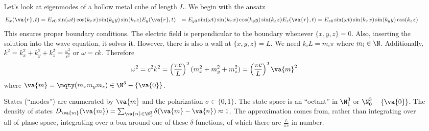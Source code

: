 \documentclass[a4paper,twoside,master.tex]{subfiles}
\begin{document}
\begin{ex}
Let's look at eigenmodes of a hollow metal cube of length $ L $. We begin with the ansatz
\begin{align}
    E_x(\va{r}, t) &= E_{x0} \sin(\omega t) \cos(k_x x) \sin(k_y y) \sin(k_z z)
    E_y(\va{r}, t) &= E_{y0} \sin(\omega t) \sin(k_x x) \cos(k_y y) \sin(k_z z)
    E_z(\va{r}, t) &= E_{z0} \sin(\omega t) \sin(k_x x) \sin(k_y y) \cos(k_z z)
\end{align}
This ensures proper boundary conditions. The electric field is perpendicular to the boundary whenever $ \{x,y,z\} = 0 $. Also, inserting the solution into the wave equation, it solves it. However, there is also a wall at $ \{x,y,z\} = L $. We need $ k_i L = m_i \pi $ where $ m_i \in \N $. Additionally, $ k^2 = k_x^2 + k_y^2 + k_z^2 = \frac{\omega^2}{c^2} $ or $ \omega = ck $. Therefore
\begin{equation}
    \omega^2 = c^2 k^2 = \left( \frac{\pi c}{L} \right)^2 (m_x^2 + m_y^2 + m_z^2) = \left( \frac{\pi c}{L} \right)^2 \va{m}^2
\end{equation}
where $ \va{m} = \mqty(m_x\\m_y\\m_z) \in \N^3 - \{\va{0}\} $.

States (``modes'') are enumerated by $ \va{m} $ and the polarization $ \sigma \in \{0,1\} $. The state space is an ``octant'' in $ \N_1^3 $ or $ \N^3_0 - \{\va{0}\} $. The density of states $ D_{\va{m}}(\va{m}) = \sum_{\va{n} \in \N_1^3} \delta(\va{m} - \va{n}) \approx 1 $. The approximation comes from, rather than integrating over all of phase space, integrating over a box around one of these $\delta$-functions, of which there are $ \frac{L}{\pi c} $ in number.

    



\end{ex}
\end{document}
